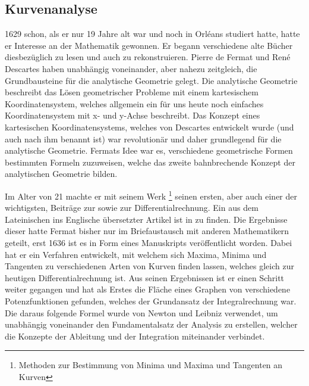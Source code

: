 \subsection{Kurvenanalyse} \label{sec:kurvenanalyse}
    1629 schon, als er nur 19 Jahre alt war und noch in Orléans studiert hatte, hatte er Interesse an der Mathematik gewonnen. Er begann verschiedene alte Bücher diesbezüglich zu lesen und auch zu rekonstruieren. Pierre de Fermat und René Descartes haben unabhängig voneinander, aber nahezu zeitgleich, die Grundbausteine für die \gls{analytische Geometrie} gelegt. Die analytische Geometrie beschreibt das Lösen geometrischer Probleme mit einem kartesischem Koordinatensystem, welches allgemein ein für uns heute noch einfaches Koordinatensystem mit x- und y-Achse beschreibt. Das Konzept eines kartesischen Koordinatensystems, welches von Descartes entwickelt wurde (und auch nach ihm benannt ist) war revolutionär und daher grundlegend für die analytische Geometrie. Fermats Idee war es, verschiedene geometrische Formen bestimmten  Formeln zuzuweisen, welche das zweite bahnbrechende Konzept der analytischen Geometrie bilden.
    
    Im Alter von 21 machte er mit seinem Werk \textit{}\footnote{Methoden zur Bestimmung von Minima und Maxima und Tangenten an Kurven} seinen ersten, aber auch einer der wichtigsten, Beiträge zur  sowie zur \Gls{Differentialrechnung}. Ein aus dem Lateinischen ins Englische übersetzter Artikel ist in \cite{fermatMinMax} zu finden. Die Ergebnisse dieser hatte Fermat bisher nur im Briefaustausch mit anderen Mathematikern geteilt, erst 1636 ist es in Form eines Manuskripts veröffentlicht worden. Dabei hat er ein Verfahren entwickelt, mit welchem sich Maxima, Minima und Tangenten zu verschiedenen Arten von Kurven finden lassen, welches gleich zur heutigen Differentialrechnung ist. Aus seinen Ergebnissen ist er einen Schritt weiter gegangen und hat als Erstes die Fläche eines Graphen von verschiedene Potenzfunktionen gefunden, welches der Grundansatz der \Gls{Integralrechnung} war. Die daraus folgende Formel wurde von Newton und Leibniz verwendet, um unabhängig voneinander den Fundamentalsatz der \Gls{Analysis} zu erstellen, welcher die Konzepte der Ableitung und der Integration miteinander verbindet.